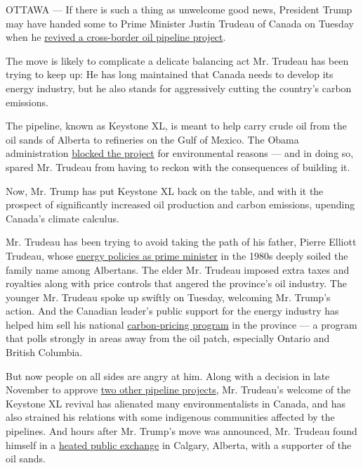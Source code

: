 OTTAWA --- If there is such a thing as unwelcome good news, President
Trump may have handed some to Prime Minister Justin Trudeau of Canada on
Tuesday when he
\href{https://www.nytimes.com/2017/01/24/us/politics/keystone-dakota-pipeline-trump.html}{revived
a cross-border oil pipeline project}.

The move is likely to complicate a delicate balancing act Mr. Trudeau
has been trying to keep up: He has long maintained that Canada needs to
develop its energy industry, but he also stands for aggressively cutting
the country's carbon emissions.

The pipeline, known as Keystone XL, is meant to help carry crude oil
from the oil sands of Alberta to refineries on the Gulf of Mexico. The
Obama administration
\href{https://www.nytimes.com/2015/11/07/us/obama-expected-to-reject-construction-of-keystone-xl-oil-pipeline.html}{blocked
the project} for environmental reasons --- and in doing so, spared Mr.
Trudeau from having to reckon with the consequences of building it.

Now, Mr. Trump has put Keystone XL back on the table, and with it the
prospect of significantly increased oil production and carbon emissions,
upending Canada's climate calculus.

Mr. Trudeau has been trying to avoid taking the path of his father,
Pierre Elliott Trudeau, whose
\href{http://www.thecanadianencyclopedia.ca/en/article/national-energy-program/}{energy
policies as prime minister} in the 1980s deeply soiled the family name
among Albertans. The elder Mr. Trudeau imposed extra taxes and royalties
along with price controls that angered the province's oil industry. The
younger Mr. Trudeau spoke up swiftly on Tuesday, welcoming Mr. Trump's
action. And the Canadian leader's public support for the energy industry
has helped him sell his national
\href{https://www.nytimes.com/2016/12/08/world/canada/canada-carbon-pricing-environment-energy.html}{carbon-pricing
program} in the province --- a program that polls strongly in areas away
from the oil patch, especially Ontario and British Columbia.

But now people on all sides are angry at him. Along with a decision in
late November to approve
\href{https://www.nytimes.com/2016/11/29/world/canada/canada-trudeau-kinder-morgan-pipeline.html}{two
other pipeline projects}, Mr. Trudeau's welcome of the Keystone XL
revival has alienated many environmentalists in Canada, and has also
strained his relations with some indigenous communities affected by the
pipelines. And hours after Mr. Trump's move was announced, Mr. Trudeau
found himself in a
\href{http://www.theglobeandmail.com/news/politics/trudeau-challenged-on-oil-sands-at-rowdy-calgary-town-hall/article33755072/}{heated
public exchange} in Calgary, Alberta, with a supporter of the oil sands.

